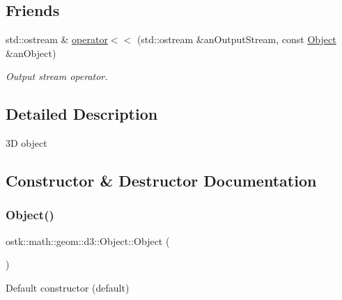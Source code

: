 \subsection*{Friends}
\begin{DoxyCompactItemize}
\item 
std\+::ostream \& \hyperlink{classostk_1_1math_1_1geom_1_1d3_1_1_object_a418df9bf4a73078f3d494edef1743f8d}{operator$<$$<$} (std\+::ostream \&an\+Output\+Stream, const \hyperlink{classostk_1_1math_1_1geom_1_1d3_1_1_object}{Object} \&an\+Object)
\begin{DoxyCompactList}\small\item\em Output stream operator. \end{DoxyCompactList}\end{DoxyCompactItemize}


\subsection{Detailed Description}
3D object 

\subsection{Constructor \& Destructor Documentation}
\mbox{\label{classostk_1_1math_1_1geom_1_1d3_1_1_object_ac507d37b0ef8755045938e43d20b0c94}} 
\subsubsection{\texorpdfstring{Object()}{Object()}}
{\footnotesize\ttfamily ostk\+::math\+::geom\+::d3\+::\+Object\+::\+Object (\begin{DoxyParamCaption}{ }\end{DoxyParamCaption})\hspace{0.3cm}{\ttfamily [default]}}



Default constructor (default) 

\mbox{\label{classostk_1_1math_1_1geom_1_1d3_1_1_object_af626942fbad7c1ea7ba80829fdaa0e01}} 

